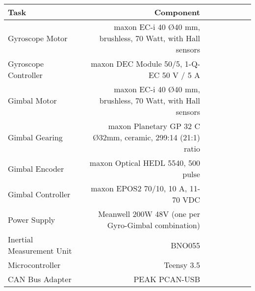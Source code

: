 \documentclass{standalone}
\begin{document}
\begin{tabular}{lrrrrrrr}\toprule
        \textbf{Task}
        & \textbf{Component} \\
    \midrule
    Gyroscope Motor & maxon EC-i 40 Ø40 mm, brushless, 70 Watt, with Hall sensors\\
    Gyroscope Controller & maxon DEC Module 50/5, 1-Q-EC 50 V / 5 A \\
    Gimbal Motor & maxon EC-i 40 Ø40 mm, brushless, 70 Watt, with Hall sensors\\
    Gimbal Gearing &  maxon Planetary GP 32 C Ø32mm, ceramic, 299:14 (21:1) ratio\\
    Gimbal Encoder &  maxon Optical HEDL 5540, 500 pulse\\
    Gimbal Controller &  maxon EPOS2 70/10, 10 A, 11- 70 VDC\\
    Power Supply & Meanwell 200W 48V (one per Gyro-Gimbal combination) \\
    Inertial Measurement Unit & BNO055 \\
    Microcontroller &  Teensy 3.5 \\
    CAN Bus Adapter &  PEAK PCAN-USB\\
    \bottomrule
\end{tabular}
\end{document}
